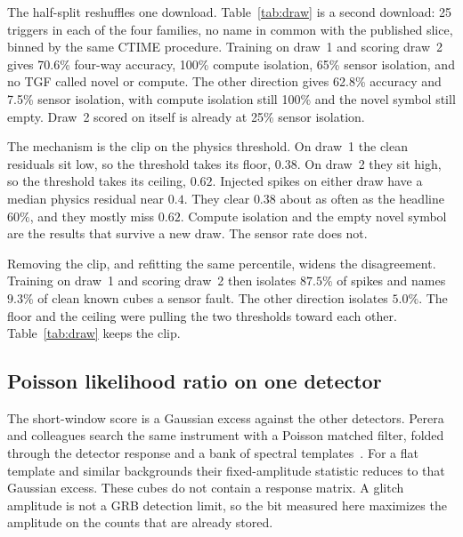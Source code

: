 \documentclass{ieeeaccess}
\begin{document}
The half-split reshuffles one download. Table~\ref{tab:draw} is a second download: 25 triggers in each of the four families, no name in common with the published slice, binned by the same CTIME procedure. Training on draw~1 and scoring draw~2 gives 70.6\% four-way accuracy, 100\% compute isolation, 65\% sensor isolation, and no TGF called novel or compute. The other direction gives 62.8\% accuracy and 7.5\% sensor isolation, with compute isolation still 100\% and the novel symbol still empty. Draw~2 scored on itself is already at 25\% sensor isolation.

The mechanism is the clip on the physics threshold. On draw~1 the clean residuals sit low, so the threshold takes its floor, $0.38$. On draw~2 they sit high, so the threshold takes its ceiling, $0.62$. Injected spikes on either draw have a median physics residual near $0.4$. They clear $0.38$ about as often as the headline $60\%$, and they mostly miss $0.62$. Compute isolation and the empty novel symbol are the results that survive a new draw. The sensor rate does not.

Removing the clip, and refitting the same percentile, widens the disagreement. Training on draw~1 and scoring draw~2 then isolates $87.5\%$ of spikes and names $9.3\%$ of clean known cubes a sensor fault. The other direction isolates $5.0\%$. The floor and the ceiling were pulling the two thresholds toward each other. Table~\ref{tab:draw} keeps the clip.



\subsection{Poisson likelihood ratio on one detector}
\label{sec:poisson}

The short-window score is a Gaussian excess against the other detectors. Perera and colleagues search the same instrument with a Poisson matched filter, folded through the detector response and a bank of spectral templates~\cite{perera2025}. For a flat template and similar backgrounds their fixed-amplitude statistic reduces to that Gaussian excess. These cubes do not contain a response matrix. A glitch amplitude is not a GRB detection limit, so the bit measured here maximizes the amplitude on the counts that are already stored.
\end{document}
